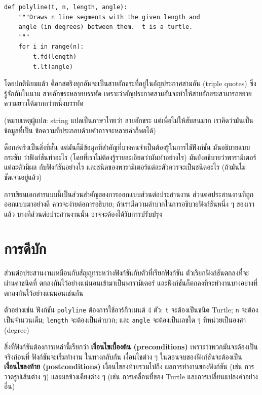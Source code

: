 \begin{verbatim}
def polyline(t, n, length, angle):
    """Draws n line segments with the given length and
    angle (in degrees) between them.  t is a turtle.
    """    
    for i in range(n):
        t.fd(length)
        t.lt(angle)
\end{verbatim}
%
โดยปกตินิยมแล้ว ด็อกสตริงทุกอันจะเป็นสายอักขระที่อยู่ในอัญประกาศสามอัน (triple quotes)  ซึ่งรู้จักกันในนาม 
สายอักขระหลายบรรทัด เพราะว่าอัญประกาศสามอันจะทำให้สายอักขระสามารถขยายความยาวได้มากกว่าหนึ่งบรรทัด

(หมายเหตุผู้แปล: string แปลเป็นภาษาไทยว่า สายอักขระ แต่เพื่อไม่ให้สับสนมาก เราคิดว่ามันเป็นข้อมูลที่เป็น
ข้อความที่ประกอบด้วยคำอาจจะหลายคำก็พอได้)

ด็อกสตริงเป็นสิ่งที่สั้น แต่มันก็มีข้อมูลที่สำคัญที่บางคนจำเป็นต้องรู้ในการใช้ฟังก์ชัน มันอธิบายแบบกระชับ
ว่าฟังก์ชันทำอะไร (โดยที่เราไม่ต้องรู้รายละเอียดว่ามันทำอย่างไร) มันยังอธิบายว่าพารามิเตอร์แต่ละตัวมีผล
กับฟังก์ชันอย่างไร และชนิดของพารามิเตอร์แต่ละตัวควรจะเป็นชนิดอะไร (ถ้ามันไม่ชัดเจนอยู่แล้ว)

การเขียนเอกสารแบบนี้เป็นส่วนสำคัญของการออกแบบส่วนต่อประสานงาน ส่วนต่อประสานงานที่ถูกออกแบบมาอย่างดี
ควรจะง่ายต่อการอธิบาย; ถ้าเรามีความลำบากในการอธิบายฟังก์ชันหนึ่ง ๆ ของเราแล้ว บางทีส่วนต่อประสานงานนั้น
อาจจะต้องได้รับการปรับปรุง


\section{การดีบัก}

ส่วนต่อประสานงานเหมือนกับสัญญาระหว่างฟังก์ชันกับตัวที่เรียกฟังก์ชัน ตัวเรียกฟังก์ชันตกลงที่จะผ่านค่าชนิดที่
ตกลงกันไว้อย่างแน่นอนเข้ามาเป็นพารามิเตอร์ และฟังก์ชันก็ตกลงที่จะทำงานบางอย่างที่ตกลงกันไว้อย่างแน่นอนเช่นกัน

ตัวอย่างเช่น ฟังก์ชัน {\tt polyline} ต้องการใช้อาร์กิวเมนต์ 4 ตัว: {\tt t} จะต้องเป็นชนิด Turtle; 
{\tt n} จะต้องเป็นจำนวนเต็ม; {\tt length} จะต้องเป็นค่าบวก; และ {\tt angle} จะต้องเป็นเลขใด ๆ 
ที่หน่วยเป็นองศา (degree)

สิ่งที่ฟังก์ชันต้องการเหล่านี้เรียกว่า {\bf เงื่อนไขเบื้องต้น (preconditions)} เพราะว่าพวกมันจะต้องเป็นจริงก่อนที่
ฟังก์ชันจะเริ่มทำงาน  ในทางกลับกัน เงื่อนไขต่าง ๆ ในตอนจบของฟังก์ชันจะต้องเป็น {\bf เงื่อนไขลงท้าย (postconditions)} 
เงื่อนไขลงท้ายรวมไปถึง ผลการทำงานของฟังก์ชัน (เช่น การวาดรูปเส้นต่าง ๆ) และผลข้างเคียงต่าง ๆ (เช่น การเคลื่อนที่ของ 
Turtle และการเปลี่ยนแปลงค่าอย่างอื่น) 

